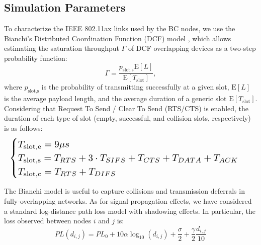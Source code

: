 \documentclass[conference]{IEEEtran}
\theoremstyle{definition}
\begin{document}
\subsection{Simulation Parameters}
To characterize the IEEE 802.11ax links used by the BC nodes, we use the Bianchi's Distributed Coordination Function (DCF) model \cite{bianchi2000performance}, which allows estimating the saturation throughput $\Gamma$ of DCF overlapping devices as a two-step probability function:
\begin{equation}
    \Gamma = \frac{p_{\text{slot,s}}\text{E}[L]}{\text{E}[T_\text{slot}]},
\end{equation}
where $p_{\text{slot,s}}$ is the probability of transmitting successfully at a given slot, $\text{E}[L]$ is the average payload length, and the average duration of a generic slot $\text{E}[T_\text{slot}]$. Considering that Request To Send / Clear To Send (RTS/CTS) is enabled, the duration of each type of slot (empty, successful, and collision slots, respectively) is as follows:
\begin{equation}
  \resizebox{\columnwidth}{!}{%
   $\begin{cases}
       T_\text{slot,e} = 9 \mu s\\
       T_\text{slot,s} = T_{RTS} + 3\cdot T_{SIFS} + T_{CTS} + T_{DATA} + T_{ACK}\\
       T_\text{slot,c} = T_{RTS} + T_{DIFS}
   \end{cases} $
   }
\end{equation}

The Bianchi model is useful to capture collisions and transmission deferrals in fully-overlapping networks. As for signal propagation effects, we have considered a standard log-distance path loss model with shadowing effects. In particular, the loss observed between nodes $i$ and $j$ is:
\begin{equation}
    PL(d_{i,j}) = PL_{0} + 10\alpha \log_{10}(d_{i,j}) + \frac{\sigma}{2} + \frac{\gamma}{2} \frac{d_{i,j}}{10}
\end{equation}
\end{document}
